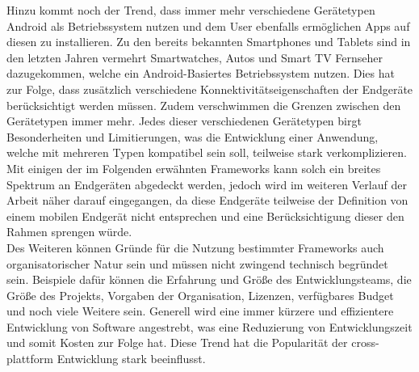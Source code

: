 \newpage
Hinzu kommt noch der Trend, dass immer mehr verschiedene Gerätetypen Android als Betriebssystem nutzen und dem User ebenfalls ermöglichen Apps auf diesen zu installieren. Zu den bereits bekannten Smartphones und Tablets sind in den letzten Jahren vermehrt Smartwatches, Autos und Smart TV Fernseher dazugekommen, welche ein Android-Basiertes Betriebssystem nutzen. Dies hat zur Folge, dass zusätzlich verschiedene Konnektivitätseigenschaften der Endgeräte berücksichtigt werden müssen. Zudem verschwimmen die Grenzen zwischen den Gerätetypen immer mehr. Jedes dieser verschiedenen Gerätetypen birgt Besonderheiten und Limitierungen, was die Entwicklung einer Anwendung, welche mit mehreren Typen kompatibel sein soll, teilweise stark verkomplizieren. Mit einigen der im Folgenden erwähnten Frameworks kann solch ein breites Spektrum an Endgeräten abgedeckt werden, jedoch wird im weiteren Verlauf der Arbeit näher darauf eingegangen, da diese Endgeräte teilweise der Definition von einem mobilen Endgerät nicht entsprechen und eine Berücksichtigung dieser den Rahmen sprengen würde.\\

Des Weiteren können Gründe für die Nutzung bestimmter Frameworks auch organisatorischer Natur sein und müssen nicht zwingend technisch begründet sein. Beispiele dafür können die Erfahrung und Größe des Entwicklungsteams, die Größe des Projekts, Vorgaben der Organisation, Lizenzen, verfügbares Budget und noch viele Weitere sein. Generell wird eine immer kürzere und effizientere Entwicklung von Software angestrebt, was eine Reduzierung von Entwicklungszeit und somit Kosten zur Folge hat. Diese Trend hat die Popularität der cross-plattform Entwicklung stark beeinflusst.

